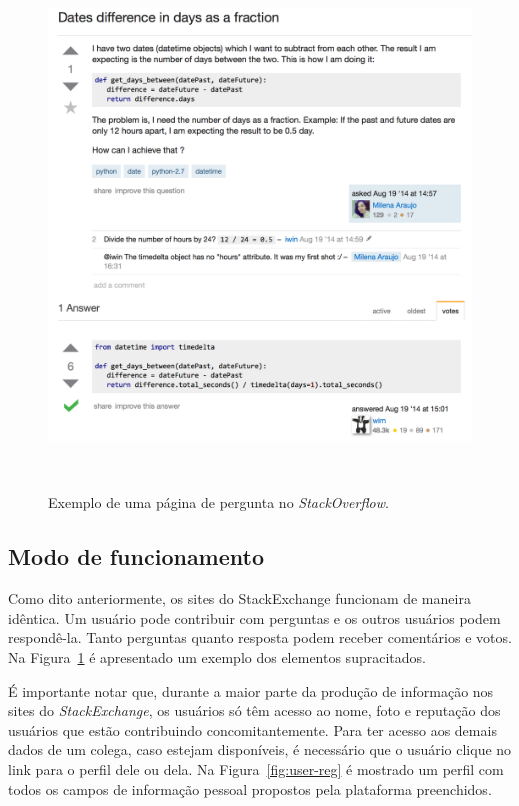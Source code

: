 \begin{figure}[!b]
  \includegraphics[width=1\columnwidth]{figures/post.png}
  \caption[Exemplo de uma página de pergunta no \emph{StackOverflow}]{Exemplo de uma página de pergunta no \emph{StackOverflow}.}~\label{fig:SOexemplo}
\end{figure}

\subsection{Modo de funcionamento} %
\label{sub:modo_de_funcionamento}

Como dito anteriormente, os sites do StackExchange funcionam de maneira idêntica. Um usuário pode contribuir com perguntas e os outros usuários podem respondê-la. Tanto perguntas quanto resposta podem receber comentários e votos. Na Figura~\ref{fig:SOexemplo} é apresentado um exemplo dos elementos supracitados.

É importante notar que, durante a maior parte da produção de informação nos sites do \emph{StackExchange}, os usuários só têm acesso ao nome, foto e reputação dos usuários que estão contribuindo concomitantemente. Para ter acesso aos demais dados de um colega, caso estejam disponíveis, é necessário que o usuário clique no link para o perfil dele ou dela. Na Figura~\ref{fig:user-reg} é mostrado um perfil com todos os campos de informação pessoal propostos pela plataforma preenchidos.

